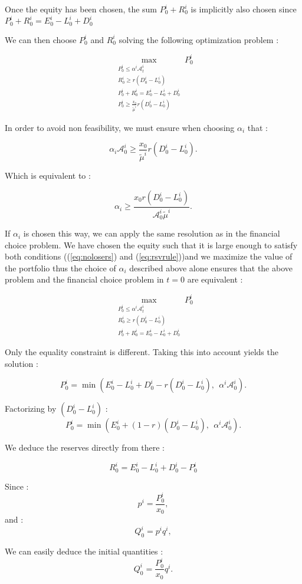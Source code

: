 \documentclass{article}
\begin{document}
\begin{appendices}
Once the equity has been chosen, the sum $P_0^i + R_0^i$ is implicitly also chosen since $ P_0^i + R_0^i = E_0^i - L_0^i + D_0^i $

We can then choose $P_0^i$ and $R_0^i$ solving the following optimization problem : 

$$\max_{\substack{P_0^i \leq \alpha^i \mathcal{A}_t^i \\ R_0^i \geq r(D_0^i - L_0^i) \\ P_0^i + R_0^i = E_0^i - L_0^i + D_0^i \\ P_0^i \geq \frac{x_0}{\tilde{\mu}^i}r(D_0^i - L_0^i)}} P_0^i$$

In order to avoid non feasibility, we must ensure when choosing $\alpha_i$ that :

$$ \alpha_i \mathcal{A}_0^i \geq \frac{x_0}{\tilde{\mu}^i}r(D_0^i - L_0^i).$$

Which is equivalent to : 

$$ \alpha_i \geq \frac{x_0 r(D_0^i - L_0^i)}{\mathcal{A}_0^i \tilde{\mu}^i}.$$

If $\alpha_i$ is chosen this way, we can apply the same resolution as in the financial choice problem. We have chosen the equity such that it is large enough to satisfy both conditions ((\ref{eq:nolosers}) and (\ref{eq:rsvrule}))and we maximize the value of the portfolio thus the choice of $\alpha_i$ described above alone ensures that the above problem and the financial choice problem in $t=0$ are equivalent : 

$$\max_{\substack{P_0^i \leq \alpha^i \mathcal{A}_t^i \\ R_0^i \geq r(D_0^i - L_0^i) \\ P_0^i + R_0^i = E_0^i - L_0^i + D_0^i}} P_0^i$$

Only the equality constraint is different. Taking this into account yields the solution : 

$$
P_0^i = \min(E_0^i - L_0^i + D_0^i - r(D_0^i - L_0^i),~~\alpha^i \mathcal{A}_0^i).
$$

Factorizing by $(D_0^i - L_0^i)$ :
$$
P_0^i = \min(E_0^i + (1 - r)(D_0^i - L_0^i),~~\alpha^i \mathcal{A}_0^i).
$$

We deduce the reserves directly from there : 

$$
R_0^i = E_0^i - L_0^i + D_0^i - P_0^i
$$

Since :
$$p^i = \frac{P_0^i}{x_0},$$ 
and : 
$$Q_0^i = p^i q^i,$$

We can easily deduce the initial quantities : 
$$Q_0^i = \frac{P_0^i}{x_0} q^i.$$


\end{appendices}
\end{document}
